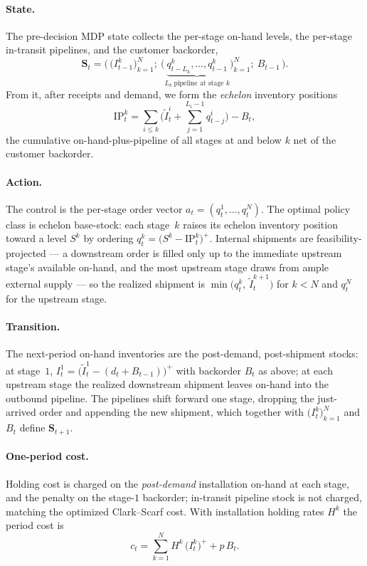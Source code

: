\documentclass[11pt]{article}
\begin{document}
\paragraph{State.}
The pre-decision MDP state collects the per-stage on-hand levels, the per-stage in-transit pipelines,
and the customer backorder,
\begin{equation*}
  \mathbf S_t = \Big(\, \big(I^k_{t-1}\big)_{k=1}^{N};\
  \big(\underbrace{q^k_{t-L_k},\dots,q^k_{t-1}}_{L_k\ \text{pipeline at stage }k}\big)_{k=1}^{N};\
  B_{t-1} \,\Big).
\end{equation*}
From it, after receipts and demand, we form the \emph{echelon} inventory positions
\begin{equation*}
  \mathrm{IP}^k_t = \sum_{i\le k}\Big(\widetilde I^i_t + \!\!\sum_{j=1}^{L_i-1}\! q^i_{t-j}\Big) - B_t,
\end{equation*}
the cumulative on-hand-plus-pipeline of all stages at and below $k$ net of the customer backorder.

\paragraph{Action.}
The control is the per-stage order vector $a_t=(q^1_t,\dots,q^N_t)$. The optimal policy class is
echelon base-stock: each stage~$k$ raises its echelon inventory position toward a level $S^k$ by
ordering $q^k_t=\big(S^k-\mathrm{IP}^k_t\big)^+$. Internal shipments are feasibility-projected --- a
downstream order is filled only up to the immediate upstream stage's available on-hand, and the most
upstream stage draws from ample external supply --- so the realized shipment is
$\min\!\big(q^k_t,\,\widetilde I^{k+1}_t\big)$ for $k<N$ and $q^N_t$ for the upstream stage.

\paragraph{Transition.}
The next-period on-hand inventories are the post-demand, post-shipment stocks: at stage~$1$,
$I^1_t=\big(\widetilde I^1_t-(d_t+B_{t-1})\big)^+$ with backorder $B_t$ as above; at each upstream
stage the realized downstream shipment leaves on-hand into the outbound pipeline. The pipelines shift
forward one stage, dropping the just-arrived order and appending the new shipment, which together with
$\big(I^k_t\big)_{k=1}^{N}$ and $B_t$ define $\mathbf S_{t+1}$.

\paragraph{One-period cost.}
Holding cost is charged on the \emph{post-demand} installation on-hand at each stage, and the penalty
on the stage-$1$ backorder; in-transit pipeline stock is not charged, matching the optimized
Clark--Scarf cost. With installation holding rates $H^k$ the period cost is
\begin{equation}
  c_t = \sum_{k=1}^{N} H^k\,\big(I^k_t\big)^+ + p\,B_t .
  \label{eq:serial-cost}
\end{equation}
\end{document}
